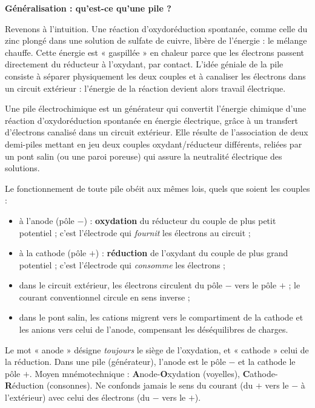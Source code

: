 \documentclass[11pt]{article}
\newcommand{\cle}[1]{{\popxbold\color{popdark}#1}}
\newcounter{popsec}
\newcounter{popsub}
\newcommand{\courssub}[1]{%
  \stepcounter{popsub}%
  \par\vspace{9pt}\noindent{\popxbold\fontsize{11.5}{13}\selectfont\color{popink}{\color{poporange}\thepopsec.\thepopsub}\hspace{6pt}#1}\par\nopagebreak\vspace{4pt}
}
\begin{document}
\courssub{Généralisation : qu'est-ce qu'une pile ?}

\textbf{Généralisation : qu'est-ce qu'une pile ?}\par
Revenons à l'intuition. Une réaction d'oxydoréduction spontanée, comme celle du zinc plongé dans une solution de sulfate de cuivre, libère de l'énergie : le mélange chauffe. Cette énergie est « gaspillée » en chaleur parce que les électrons passent directement du réducteur à l'oxydant, par contact. L'idée géniale de la pile consiste à \cle{séparer physiquement} les deux couples et à \cle{canaliser} les électrons dans un circuit extérieur : l'énergie de la réaction devient alors travail électrique.

\begin{definition}
Une \cle{pile électrochimique} est un générateur qui convertit l'énergie chimique d'une réaction d'oxydoréduction \cle{spontanée} en énergie électrique, grâce à un transfert d'électrons \cle{canalisé} dans un circuit extérieur. Elle résulte de l'association de \cle{deux demi-piles} mettant en jeu deux couples oxydant/réducteur \cle{différents}, reliées par un pont salin (ou une paroi poreuse) qui assure la neutralité électrique des solutions.
\end{definition}

Le fonctionnement de toute pile obéit aux mêmes lois, quels que soient les couples :

\begin{itemize}
\item à l'\cle{anode} (pôle $-$) : \textbf{oxydation} du réducteur du couple de plus petit potentiel ; c'est l'électrode qui \emph{fournit} les électrons au circuit ;
\item à la \cle{cathode} (pôle $+$) : \textbf{réduction} de l'oxydant du couple de plus grand potentiel ; c'est l'électrode qui \emph{consomme} les électrons ;
\item dans le circuit extérieur, les \cle{électrons} circulent du pôle $-$ vers le pôle $+$ ; le courant conventionnel circule en sens inverse ;
\item dans le pont salin, les \cle{cations} migrent vers le compartiment de la cathode et les \cle{anions} vers celui de l'anode, compensant les déséquilibres de charges.
\end{itemize}

\begin{attention}[Anode = oxydation, dans tous les cas]
Le mot « anode » désigne \emph{toujours} le siège de l'oxydation, et « cathode » celui de la réduction. Dans une pile (générateur), l'anode est le pôle $-$ et la cathode le pôle $+$. Moyen mnémotechnique : \textbf{A}node-\textbf{O}xydation (voyelles), \textbf{C}athode-\textbf{R}éduction (consonnes). Ne confonds jamais le sens du courant (du $+$ vers le $-$ à l'extérieur) avec celui des électrons (du $-$ vers le $+$).
\end{attention}
\end{document}
